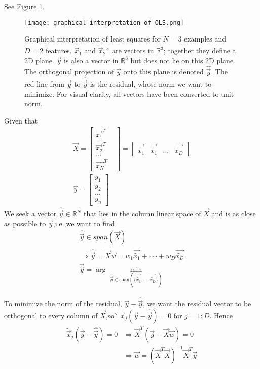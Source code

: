 See Figure \ref{fig:graphical-interpretation-of-OLS}.
\begin{figure}[hbtp]
\centering
    \texttt{[image: graphical-interpretation-of-OLS.png]}
\caption{Graphical interpretation of least squares for $N=3$ examples and $D=2$ features. $\tilde{\vec{x}}_1$ and $\tilde{\vec{x}}_2$˜ are vectors in $\mathbb{R}^3$; together they define a 2D plane. $\vec{y}$ is also a vector in $\mathbb{R}^3$ but does not lie on this 2D plane. The orthogonal projection of $\vec{y}$ onto this plane is denoted $\hat{\vec{y}}$. The red line from $\vec{y}$ to $\hat{\vec{y}}$ is the residual, whose norm we want to minimize. For visual clarity, all vectors have been converted to unit norm.}
\label{fig:graphical-interpretation-of-OLS} 
\end{figure}
Given that
\begin{eqnarray}
\vec{X} = \begin{bmatrix}
\vec{x_1}^T &\\
\vec{x_2}^T &\\
 ...        &\\
\vec{x_N}^T
\end{bmatrix} 
= \begin{bmatrix}
\vec{\tilde{x_1}} & \vec{\tilde{x_1}} & ... &\vec{\tilde{x_D}}
\end{bmatrix}\\
\vec{y} = \begin{bmatrix}
y_1 \\
y_2 \\
... \\
y_n
\end{bmatrix} 
\end{eqnarray}
We seek a vector $\hat{\vec{y}} \in \mathbb{R}^N$ that lies in the column linear space of $\vec{X}$ and is as close as possible to $\vec{y}$,i.e.,we want to find
\begin{eqnarray}
\hat{\vec{y}} \in span(\vec{X}) \\
\Rightarrow \hat{\vec{y}} = \vec{X}\vec{w} = w_1\vec{\tilde{x_1}}+\cdot\cdot\cdot+w_D\vec{\tilde{x_D}} \\
\vec{\hat{y}}=\arg\min\limits_{\hat{\vec{y}} \in \text{span} (\{\vec{\tilde{x_1}},...,\vec{\tilde{x_D}}\})}
\end{eqnarray}

To minimize the norm of the residual, $\vec{y}-\hat{\vec{y}}$, we want the residual vector to be orthogonal to every column of $\vec{X}$,so˜ $\tilde{\vec{x}}_j(\vec{y}-\hat{\vec{y}})=0$ for $j=1:D$. Hence
\begin{equation}\begin{split}
\tilde{\vec{x}}_j(\vec{y}-\hat{\vec{y}})=0 & \Rightarrow \vec{X}^T(\vec{y}-\vec{X}\vec{w})=0 \\
                                           & \Rightarrow \vec{w}=(\vec{X}^T\vec{X})^{-1}\vec{X}^T\vec{y}
\end{split}\end{equation}


